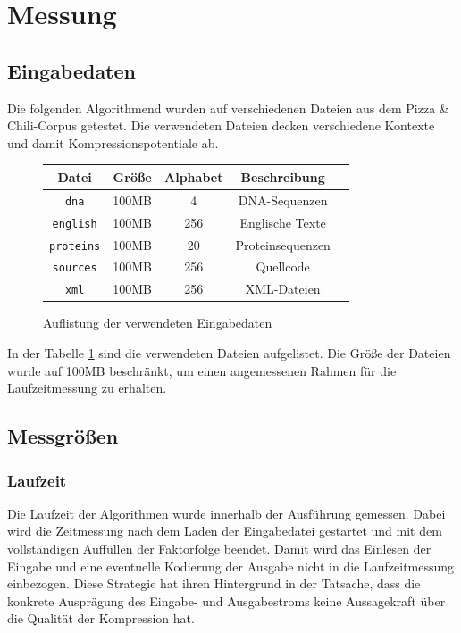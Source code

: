 \section{Messung}

\subsection{Eingabedaten}
Die folgenden Algorithmend wurden auf verschiedenen Dateien aus dem Pizza \& Chili-Corpus getestet. Die verwendeten Dateien decken verschiedene Kontexte und damit
Kompressionspotentiale ab.
\begin{figure}[h]
    \centering
    \caption{Auflistung der verwendeten Eingabedaten}
    \label{inputdata}
    \begin{tabular}{|c|c|c|c|c|}
        \hline
        \textbf{Datei} & \textbf{Größe} & \textbf{Alphabet} & \textbf{Beschreibung} \\
        \hline
        \texttt{dna} & 100MB & 4 & DNA-Sequenzen \\
        \hline
        \texttt{english} & 100MB & 256 & Englische Texte \\
        \hline
        \texttt{proteins} & 100MB & 20 & Proteinsequenzen \\
        \hline
        \texttt{sources} & 100MB & 256 & Quellcode \\
        \hline
        \texttt{xml} & 100MB & 256 & XML-Dateien \\
        \hline
    \end{tabular}
\end{figure}
In der Tabelle \ref{inputdata} sind die verwendeten Dateien aufgelistet. Die Größe der Dateien wurde auf 100MB beschränkt, um einen angemessenen Rahmen für die 
Laufzeitmessung zu erhalten.

\subsection{Messgrößen}

\subsubsection{Laufzeit}
Die Laufzeit der Algorithmen wurde innerhalb der Ausführung gemessen. Dabei wird die Zeitmessung nach dem Laden der Eingabedatei gestartet und mit dem vollständigen
Auffüllen der Faktorfolge beendet. Damit wird das Einlesen der Eingabe und eine eventuelle Kodierung der Ausgabe nicht in die Laufzeitmessung einbezogen. Diese Strategie
hat ihren Hintergrund in der Tatsache, dass die konkrete Ausprägung des Eingabe- und Ausgabestroms keine Aussagekraft über die Qualität der Kompression hat.

